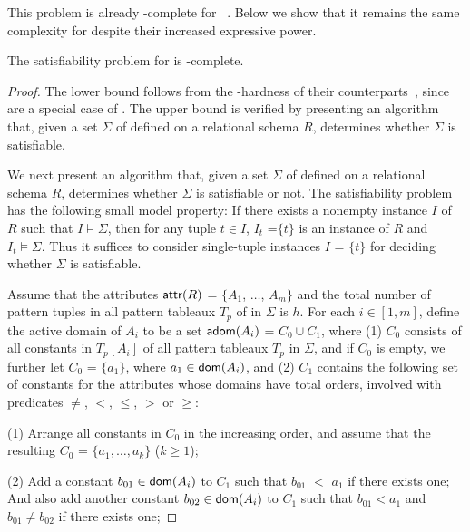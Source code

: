 This problem is already \NP-complete for \CFDs~\cite{CFDs}.
Below we show that it remains the
same complexity for \pCFDs despite their increased
expressive power.

\begin{prop}
\label{thm-sat-pcfd-fin} The satisfiability problem for \pCFDs is
\NP-complete.
\end{prop}

\begin{proof} The lower bound follows from the \NP-hardness of their \CFDs
counterparts~\cite{CFDs}, since \CFDs are a special case of \pCFDs.
The upper bound is verified by presenting an \NP algorithm that,
given a set $\Sigma$ of \pCFDs defined on a relational schema $R$,
determines whether $\Sigma$ is satisfiable. 

We next present an \NP
algorithm that, given a set $\Sigma$ of \pCFDs defined on a
relational schema $R$, determines whether $\Sigma$ is satisfiable or not.
The satisfiability problem has the following small model property:
If there exists a nonempty instance $I$ of $R$ such that
$I\models\Sigma$, then for any tuple $t\in I$, $I_t$ =$\{t\}$ is an
instance of $R$ and $I_t\models\Sigma$. Thus it suffices to consider
single-tuple instances $I$ = $\{t\}$ for deciding whether $\Sigma$
is satisfiable.

Assume \kwlog that the attributes $\protect\mathsf{attr}(R)$ = $\{A_1$, $\dots$,
$A_m\}$ and the total number of pattern tuples in all pattern
tableaux $T_p$ of \pCFDs in $\Sigma$ is $h$. For each $i\in [1, m]$, define
the active domain of $A_i$ to be a set ${\mathsf{adom}}(A_i)$ = $C_0\cup C_1$,
where (1) $C_0$ consists of all constants in $T_p[A_i]$ of all
pattern tableaux $T_p$ in $\Sigma$, and if $C_0$ is empty, we further let $C_0$ = $\{a_1\}$, where
$a_1\in\protect\mathsf{dom}(A_i)$, and (2) $C_1$ contains the
following set of constants for the attributes whose domains have
total orders, \ie involved with predicates $\ne$, $<$, $\le$, $>$ or $\ge$: 


\bi
\item[(1)] Arrange all constants in $C_0$ in the increasing order, and
assume that the resulting $C_0$ = $\{a_1, \ldots, a_k\}$ ($k\ge 1$);

\item[(2)] Add a constant $b_{01}\in\protect\mathsf{dom}(A_i)$ to $C_1$ such that $b_{01}$ $<$ $a_1$ if there
exists one; And also add another constant $b_{02}\in\protect\mathsf{dom}(A_i)$ to $C_1$
such that $b_{01} < a_1$ and $b_{01}\ne b_{02}$ if there exists one;


\end{proof}
